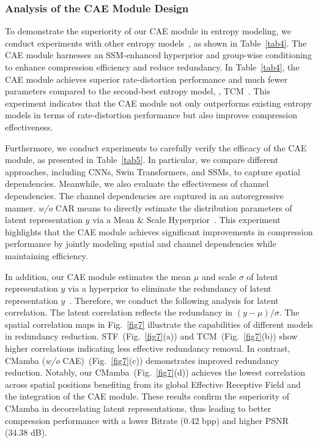 \subsubsection{Analysis of the CAE Module Design}

To demonstrate the superiority of our CAE module in entropy modeling, we conduct experiments with other entropy models~\cite{minnen2020channel, he2022elic, liu2023learned, li2024frequency}, as shown in Table~\ref{tab4}. 
The CAE module harnesses an SSM-enhanced hyperprior and group-wise conditioning to enhance compression efficiency and reduce redundancy. 
In Table~\ref{tab4}, the CAE module achieves superior rate-distortion performance and much fewer parameters compared to the second-best entropy model, \ie, TCM~\cite{liu2023learned}.
This experiment indicates that the CAE module not only outperforms existing entropy models in terms of rate-distortion performance but also improves compression effectiveness.




Furthermore, we conduct experiments to carefully verify the efficacy of the CAE module, as presented in Table~\ref{tab5}. 
In particular, we compare different approaches, including CNNs, Swin Transformers, and SSMs, to capture spatial dependencies.
Meanwhile, we also evaluate the effectiveness of channel dependencies.
The channel dependencies are captured in an autoregressive manner.
\textit{w/o} CAR means to directly estimate the distribution parameters of latent representation $y$ via a Mean \& Scale Hyperprior~\cite{minnen2018joint}.
This experiment highlights that the CAE module achieves significant improvements in compression performance by jointly modeling spatial and channel dependencies while maintaining efficiency.


In addition, our CAE module estimates the mean $\mu$ and scale $\sigma$ of latent representation $y$ via a hyperprior to eliminate the redundancy of latent representation $y$~\cite{balle2018variational, cheng2020learned}.
Therefore, we conduct the following analysis for latent correlation.
The latent correlation reflects the redundancy in $(y - \mu) / \sigma$. 
The spatial correlation maps in Fig.~\ref{fig7} illustrate the capabilities of different models in redundancy reduction. 
STF~(Fig.~\ref{fig7}(a)) and TCM~(Fig.~\ref{fig7}(b)) show higher correlations indicating less effective redundancy removal. 
In contrast, CMamba (\textit{w/o} CAE)~(Fig.~\ref{fig7}(c)) demonstrates improved redundancy reduction. 
Notably, our CMamba~(Fig.~\ref{fig7}(d)) achieves the lowest correlation across spatial positions benefiting from its global Effective Receptive Field and the integration of the CAE module. 
These results confirm the superiority of CMamba in decorrelating latent representations, thus leading to better compression performance with a lower Bitrate (0.42 bpp) and higher PSNR (34.38 dB).
